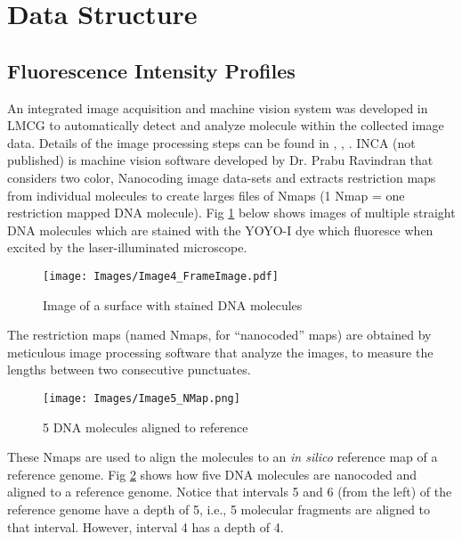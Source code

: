 \section{Data Structure} \label{Ch2}

\subsection{Fluorescence Intensity Profiles}
An integrated image acquisition and machine vision system was developed in LMCG to automatically detect and analyze molecule within the collected image data. Details of the image processing steps can be found in \cite{Dimalanta_etal_2004_AnalChem}, \cite{Jo_etal_2007_PNAS}, \cite{Ravindran_Gupta_2015_GigaScience}. INCA (not published) is machine vision software developed by Dr. Prabu Ravindran that considers two color, Nanocoding image data-sets and extracts restriction maps from individual molecules to create larges files of Nmaps (1 Nmap = one restriction mapped DNA molecule). Fig \ref{fig:Fig2_FrameImage} below shows images of multiple straight DNA molecules which are stained with the YOYO-I dye which fluoresce when excited by the laser-illuminated microscope.

\begin{figure}[H]
\begin{center}
\texttt{[image: Images/Image4\_FrameImage.pdf]}
\end{center}
\caption{Image of a surface with stained DNA molecules}
\label{fig:Fig2_FrameImage}
\end{figure}

The restriction maps (named Nmaps, for ``nanocoded'' maps) are obtained by meticulous image processing software that analyze the images, to measure the lengths between two consecutive punctuates. 
\begin{figure}[H]
\begin{center}
\texttt{[image: Images/Image5\_NMap.png]}
\end{center}
\caption{5 DNA molecules aligned to reference \cite{Kounovsky_etal_2013_Macromolecules}}
\label{fig:Fig2_NMap}
\end{figure}

These Nmaps are used to align the molecules to an {\emph{in silico}} reference map of a reference genome. Fig \ref{fig:Fig2_NMap} shows how five DNA molecules are nanocoded and aligned to a reference genome. Notice that intervals 5 and 6 (from the left) of the reference genome have a depth of 5, i.e., 5 molecular fragments are aligned to that interval. However, interval 4 has a depth of 4. \\

